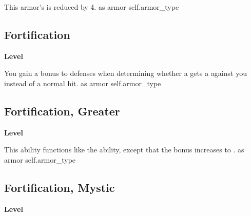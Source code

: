 \vspace{-1.5em}  %
This armor's  is reduced by 4.
 
 as armor
 {self.armor_type}
\begin{multicols}{2}
\lowercase{\hypertarget{item:Fortification}{}}\label{item:Fortification}
\hypertarget{item:Fortification}{\subsection{Fortification}}
\columnbreak%
\begin{flushright}
\large\textbf{ Level}
\end{flushright}
\end{multicols}
\vspace{-1.5em}  %
You gain a  bonus to defenses when determining whether a  gets a  against you instead of a normal hit.
 
 as armor
 {self.armor_type}
\begin{multicols}{2}
\lowercase{\hypertarget{item:Fortification, Greater}{}}\label{item:Fortification, Greater}
\hypertarget{item:Fortification, Greater}{\subsection{Fortification, Greater}}
\columnbreak%
\begin{flushright}
\large\textbf{ Level}
\end{flushright}
\end{multicols}
\vspace{-1.5em}  %
This ability functions like the  ability, except that the bonus increases to .
 
 as armor
 {self.armor_type}
\begin{multicols}{2}
\lowercase{\hypertarget{item:Fortification, Mystic}{}}\label{item:Fortification, Mystic}
\hypertarget{item:Fortification, Mystic}{\subsection{Fortification, Mystic}}
\columnbreak%
\begin{flushright}
\large\textbf{ Level}
\end{flushright}
\end{multicols}
